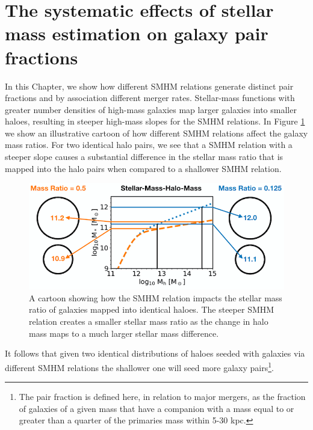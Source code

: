 \section{The systematic effects of stellar mass estimation on galaxy pair fractions}


In this Chapter, we show how different SMHM relations generate distinct pair fractions and by association different merger rates. 
Stellar-mass functions with greater number densities of high-mass galaxies map larger galaxies into smaller haloes, resulting in steeper high-mass slopes for the SMHM relations.
In Figure \ref{fig:MassRatioCartoon} we show an illustrative cartoon of how different SMHM relations affect the galaxy mass ratios. 
For two identical halo pairs, we see that a SMHM relation with a steeper slope causes a substantial difference in the stellar mass ratio that is mapped into the halo pairs when compared to a shallower SMHM relation. 

\begin{figure}[h]
    \centering
    \includegraphics[width = \linewidth]{Figures/Chapter5/MassRatioCartoon.png}
    \caption{A cartoon showing how the SMHM relation impacts the stellar mass ratio of galaxies mapped into identical haloes. The steeper SMHM relation creates a smaller stellar mass ratio as the change in halo mass maps to a much larger stellar mass difference.}
    \label{fig:MassRatioCartoon}
\end{figure}

It follows that given two identical distributions of haloes seeded with galaxies via different SMHM relations the shallower one will seed more galaxy pairs\footnote{The pair fraction is defined here, in relation to major mergers, as the fraction of galaxies of a given mass that have a companion with a mass equal to or greater than a quarter of the primaries mass within 5-30 kpc.}.


